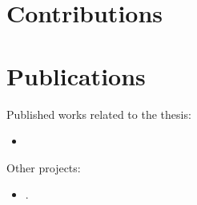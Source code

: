 \section{Contributions}


\section{Publications}
Published works related to the thesis:
\begin{itemize}
	\item 
\end{itemize}

Other projects:
\begin{itemize}
	\item {}.
\end{itemize}
